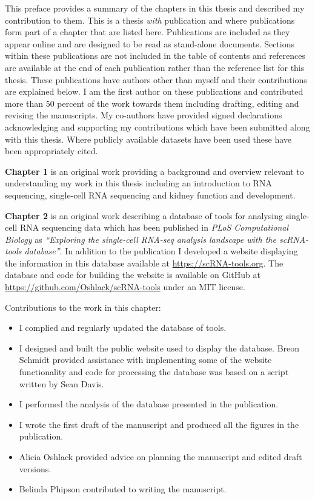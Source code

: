 \documentclass[11pt,a4paper,titlepage,twoside,openright]{style/unimelbthesis}
\theoremstyle{definition}
\theoremstyle{definition}
\theoremstyle{definition}
\theoremstyle{remark}
\begin{document}
\begin{frontmatter}
\begin{preface}
    This preface provides a summary of the chapters in this thesis and described my contribution to them. This is a thesis \emph{with} publication and where publications form part of a chapter that are listed here. Publications are included as they appear online and are designed to be read as stand-alone documents. Sections within these publications are not included in the table of contents and references are available at the end of each publication rather than the reference list for this thesis. These publications have authors other than myself and their contributions are explained below. I am the first author on these publications and contributed more than 50 percent of the work towards them including drafting, editing and revising the manuscripts. My co-authors have provided signed declarations acknowledging and supporting my contributions which have been submitted along with this thesis. Where publicly available datasets have been used these have been appropriately cited.
    
    \textbf{Chapter 1} is an original work providing a background and overview relevant to understanding my work in this thesis including an introduction to RNA sequencing, single-cell RNA sequencing and kidney function and development.
    
    \textbf{Chapter 2} is an original work describing a database of tools for analysing single-cell RNA sequencing data which has been published in \emph{PLoS Computational Biology} as \emph{``Exploring the single-cell RNA-seq analysis landscape with the scRNA-tools database''}. In addition to the publication I developed a website displaying the information in this database available at \url{https://scRNA-tools.org}. The database and code for building the website is available on GitHub at \url{https://github.com/Oshlack/scRNA-tools} under an MIT license.
    
    Contributions to the work in this chapter:
    
    \begin{itemize}
    \tightlist
    \item
      I complied and regularly updated the database of tools.
    \item
      I designed and built the public website used to display the database. Breon Schmidt provided assistance with implementing some of the website functionality and code for processing the database was based on a script written by Sean Davis.
    \item
      I performed the analysis of the database presented in the publication.
    \item
      I wrote the first draft of the manuscript and produced all the figures in the publication.
    \item
      Alicia Oshlack provided advice on planning the manuscript and edited draft versions.
    \item
      Belinda Phipson contributed to writing the manuscript.
    \end{itemize}
    

\end{preface}
\end{frontmatter}
\end{document}
